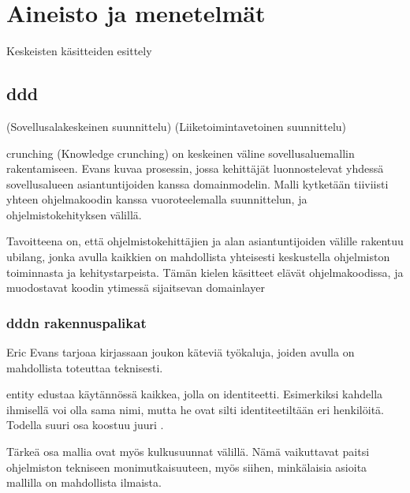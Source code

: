 \vspace{21.5pt}

\hypertarget{aineisto-ja-menetelmuxe4t}{%
\section{Aineisto ja menetelmät}\label{aineisto-ja-menetelmuxe4t}}

Keskeisten käsitteiden esittely

\hypertarget{section}{%
\subsection{\texorpdfstring{\gls{ddd}}{}}\label{section}}

(Sovellusalakeskeinen suunnittelu) (Liiketoimintavetoinen suunnittelu)

\Gls{crunching} (Knowledge crunching) on keskeinen väline
sovellusaluemallin rakentamiseen. Evans kuvaa prosessin, jossa
kehittäjät luonnostelevat yhdessä sovellusalueen asiantuntijoiden kanssa
\gls{domainmodel}in. Malli kytketään tiiviisti yhteen ohjelmakoodin
kanssa vuoroteelemalla suunnittelun, ja ohjelmistokehityksen välillä.
\cite[s. 13]{evans:ddd}

Tavoitteena on, että ohjelmistokehittäjien ja alan asiantuntijoiden
välille rakentuu \gls{ubilang}, jonka avulla kaikkien on mahdollista
yhteisesti keskustella ohjelmiston toiminnasta ja kehitystarpeista.
Tämän kielen käsitteet elävät ohjelmakoodissa, ja muodostavat koodin
ytimessä sijaitsevan \gls{domainlayer}

\hypertarget{n-rakennuspalikat}{%
\subsubsection{\texorpdfstring{\gls{ddd}n
rakennuspalikat}{n rakennuspalikat}}\label{n-rakennuspalikat}}

Eric Evans tarjoaa kirjassaan joukon käteviä työkaluja, joiden avulla
 on mahdollista toteuttaa teknisesti.

\Gls{entity} edustaa käytännössä kaikkea, jolla on identiteetti.
Esimerkiksi kahdella ihmisellä voi olla sama nimi, mutta he ovat silti
identiteetiltään eri henkilöitä. Todella suuri osa
 koostuu juuri
.

Tärkeä osa mallia ovat myös kulkusuunnat 
välillä. Nämä vaikuttavat paitsi ohjelmiston tekniseen
monimutkaisuuteen, myös siihen, minkälaisia asioita mallilla on
mahdollista ilmaista.

